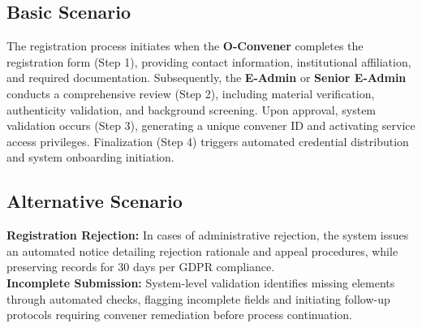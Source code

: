 \subsection{Basic Scenario}
The registration process initiates when the \textbf{O-Convener} completes the registration form (Step 1), providing contact information, institutional affiliation, and required documentation. Subsequently, the \textbf{E-Admin} or \textbf{Senior E-Admin} conducts a comprehensive review (Step 2), including material verification, authenticity validation, and background screening. Upon approval, system validation occurs (Step 3), generating a unique convener ID and activating service access privileges. Finalization (Step 4) triggers automated credential distribution and system onboarding initiation.

\subsection{Alternative Scenario}
\textbf{Registration Rejection:} In cases of administrative rejection, the system issues an automated notice detailing rejection rationale and appeal procedures, while preserving records for 30 days per GDPR compliance. \\
\textbf{Incomplete Submission:} System-level validation identifies missing elements through automated checks, flagging incomplete fields and initiating follow-up protocols requiring convener remediation before process continuation.

